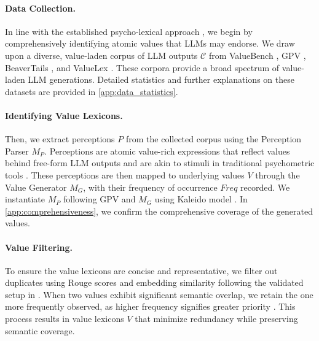 \paragraph{Data Collection.} In line with the established psycho-lexical approach \cite{de2016values}, we begin by comprehensively identifying atomic values that LLMs may endorse. We draw upon a diverse, value-laden corpus of LLM outputs \(\mathcal{C}\) from ValueBench \cite{ren2024valuebench}, GPV \cite{ye2025gpv}, BeaverTails \cite{ji2024beavertails}, and ValueLex \cite{biedma2024beyond}. These corpora provide a broad spectrum of value-laden LLM generations. Detailed statistics and further explanations on these datasets are provided in \cref{app:data_statistics}.

\paragraph{Identifying Value Lexicons.} Then, we extract perceptions \( P \) from the collected corpus using the Perception Parser \( M_{P} \). Perceptions are atomic value-rich expressions that reflect values behind free-form LLM outputs and are akin to stimuli in traditional psychometric tools \cite{ye2025gpv}. These perceptions are then mapped to underlying values \( V \) through the Value Generator \( M_{G} \), with their frequency of occurrence \( Freq \) recorded. We instantiate \( M_{P} \) following GPV \cite{ye2025gpv} and \( M_{G} \) using Kaleido model \cite{sorensen2024value}. In \cref{app:comprehensiveness}, we confirm the comprehensive coverage of the generated values.

\paragraph{Value Filtering.} To ensure the value lexicons are concise and representative, we filter out duplicates using Rouge scores and embedding similarity following the validated setup in \cite{sorensen2024value}. When two values exhibit significant semantic overlap, we retain the one more frequently observed, as higher frequency signifies greater priority \cite{ponizovskiy2020development}. This process results in value lexicons \( V \) that minimize redundancy while preserving semantic coverage.

